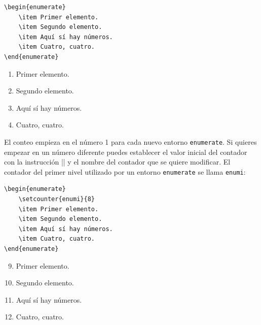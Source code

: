 \lstruleb\vspace{-5mm}
\begin{multicols}{2}
\begin{lstlisting}[style=latex,frame={}]
\begin{enumerate}
	\item Primer elemento.
	\item Segundo elemento.
	\item Aquí sí hay números.
	\item Cuatro, cuatro.
\end{enumerate}
\end{lstlisting}

\columnbreak
\begin{enumerate}
	\item Primer elemento.
	\item Segundo elemento.
	\item Aquí sí hay números.
	\item Cuatro, cuatro.
\end{enumerate}
\end{multicols}
\vspace{-7mm}\lstruleb

El conteo empieza en el número 1 para cada nuevo entorno \texttt{enumerate}. Si quieres empezar en un número diferente puedes establecer el valor inicial del contador con la instrucción |\setcounter| y el nombre del contador que se quiere modificar. El contador del primer nivel utilizado por un entorno \texttt{enumerate} se llama \texttt{enumi}:

\lstruleb\vspace{-5mm}
\begin{multicols}{2}
\begin{lstlisting}[style=latex,frame={}]
\begin{enumerate}
	\setcounter{enumi}{8}
	\item Primer elemento.
	\item Segundo elemento.
	\item Aquí sí hay números.
	\item Cuatro, cuatro.
\end{enumerate}
\end{lstlisting}

\columnbreak
\begin{enumerate}
	\setcounter{enumi}{8}
	\item Primer elemento.
	\item Segundo elemento.
	\item Aquí sí hay números.
	\item Cuatro, cuatro.
\end{enumerate}
\end{multicols}
\vspace{-7mm}\lstruleb

